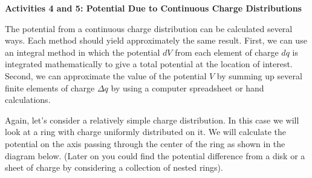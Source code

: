 { \par}

\answerspace{15mm}

\textbf{Activities 4 and 5: Potential Due to Continuous Charge Distributions}

The potential from a continuous charge distribution can be calculated
several ways. Each method should yield approximately the same result.
First, we can use an integral method in which the potential $dV$ from
each element of charge $dq$ is integrated mathematically to give a total
potential at the location of interest. Second, we can approximate
the value of the potential $V$ by summing up several finite elements
of charge \( \Delta q \) by using a computer spreadsheet or hand
calculations.

Again, let's consider a relatively simple charge distribution. In
this case we will look at a ring with charge uniformly distributed
on it. We will calculate the potential on the axis passing through
the center of the ring as shown in the diagram below. (Later on you
could find the potential difference from a disk or a sheet of charge
by considering a collection of nested rings).

